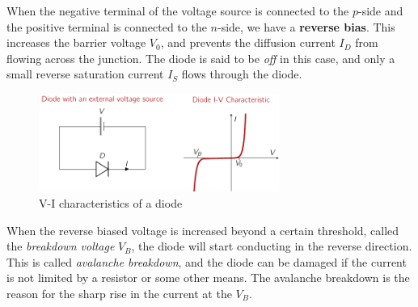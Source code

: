 When the negative terminal of the voltage source is connected to the $p$-side and the positive terminal is connected to the $n$-side, we have a \textbf{reverse bias}. This increases the barrier voltage $V_0$, and prevents the diffusion current $I_D$ from flowing across the junction. The diode is said to be \textit{off} in this case, and only a small reverse saturation current $I_S$ flows through the diode.
\begin{figure}[t]
    \centering
    \includegraphics[width=0.7\textwidth]{figure/ch03/fig03-03.pdf}
    \caption{V-I characteristics of a diode}
    \label{fig:03-diode-vi}
\end{figure}
When the reverse biased voltage is increased beyond a certain threshold, called the \textit{breakdown voltage} $V_B$, the diode will start conducting in the reverse direction. This is called \textit{avalanche breakdown}, and the diode can be damaged if the current is not limited by a resistor or some other means. The avalanche breakdown is the reason for the sharp rise in the current at the $V_B$.

